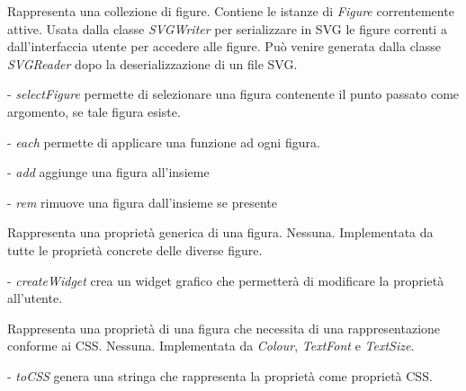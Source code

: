Rappresenta una collezione di figure.
Contiene le istanze di \textit{Figure} correntemente attive.
Usata dalla classe \textit{SVGWriter} per serializzare in SVG le figure correnti a dall'interfaccia utente per accedere alle figure. Pu\`o venire generata dalla classe \textit{SVGReader} dopo la deserializzazione di un file SVG.
\begin{elencopuntato}[\normindent]
\item[-]  \textit{selectFigure} permette di selezionare una figura contenente il punto passato come argomento, se tale figura esiste.
\item[-]  \textit{each} permette di applicare una funzione ad ogni figura.
\item[-]  \textit{add} aggiunge una figura all'insieme
\item[-]  \textit{rem} rimuove una figura dall'insieme se presente
\end{elencopuntato}

Rappresenta una propriet\`a generica di una figura.
Nessuna.
Implementata da tutte le propriet\`a concrete delle diverse figure.
\begin{elencopuntato}[\normindent]
\item[-] \textit{createWidget} crea un widget grafico che permetter\`a di modificare la propriet\`a all'utente.
\end{elencopuntato}

Rappresenta una propriet\`a di una figura che necessita di una rappresentazione conforme ai CSS.
Nessuna.
Implementata da \textit{Colour}, \textit{TextFont} e \textit{TextSize}. 
\begin{elencopuntato}[\normindent]
\item[-] \textit{toCSS} genera una stringa che rappresenta la propriet\`a come propriet\`a CSS.
\end{elencopuntato}

